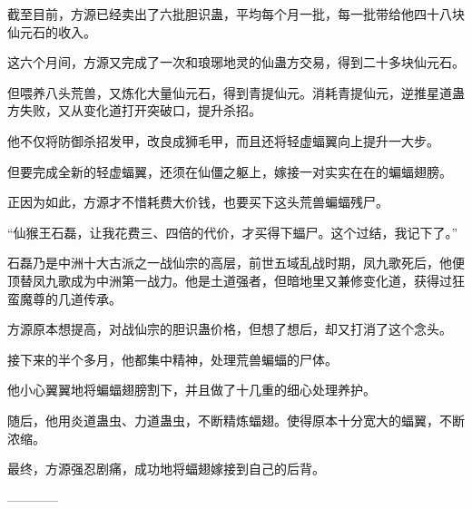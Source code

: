 \begin{this_body}
截至目前，方源已经卖出了六批胆识蛊，平均每个月一批，每一批带给他四十八块仙元石的收入。

这六个月间，方源又完成了一次和琅琊地灵的仙蛊方交易，得到二十多块仙元石。

但喂养八头荒兽，又炼化大量仙元石，得到青提仙元。消耗青提仙元，逆推星道蛊方失败，又从变化道打开突破口，提升杀招。

他不仅将防御杀招发甲，改良成狮毛甲，而且还将轻虚蝠翼向上提升一大步。

但要完成全新的轻虚蝠翼，还须在仙僵之躯上，嫁接一对实实在在的蝙蝠翅膀。

正因为如此，方源才不惜耗费大价钱，也要买下这头荒兽蝙蝠残尸。

“仙猴王石磊，让我花费三、四倍的代价，才买得下蝠尸。这个过结，我记下了。”

石磊乃是中洲十大古派之一战仙宗的高层，前世五域乱战时期，凤九歌死后，他便顶替凤九歌成为中洲第一战力。他是土道强者，但暗地里又兼修变化道，获得过狂蛮魔尊的几道传承。

方源原本想提高，对战仙宗的胆识蛊价格，但想了想后，却又打消了这个念头。

接下来的半个多月，他都集中精神，处理荒兽蝙蝠的尸体。

他小心翼翼地将蝙蝠翅膀割下，并且做了十几重的细心处理养护。

随后，他用炎道蛊虫、力道蛊虫，不断精炼蝠翅。使得原本十分宽大的蝠翼，不断浓缩。

最终，方源强忍剧痛，成功地将蝠翅嫁接到自己的后背。

------------

\end{this_body}

